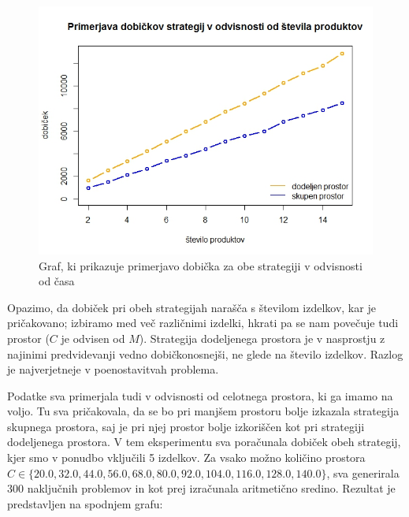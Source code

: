 \documentclass[a4paper]{article}
\begin{document}
\begin{figure}[ht]

\includegraphics [scale = 0.68]{primerjava-strategij-stevilo-produktov}
\caption{Graf, ki prikazuje primerjavo dobička za obe strategiji v odvisnosti od časa}

\end{figure}


Opazimo, da dobiček pri obeh strategijah narašča s številom izdelkov, kar je pričakovano; izbiramo med več različnimi izdelki, hkrati pa se nam povečuje tudi prostor ($C$ je odvisen od $M$). Strategija dodeljenega prostora je v nasprostju z najinimi predvidevanji vedno dobičkonosnejši, ne glede na število izdelkov. Razlog je najverjetneje v poenostavitvah problema. 

Podatke sva primerjala tudi v odvisnosti od celotnega prostora, ki ga imamo na voljo. Tu sva pričakovala, da se bo pri manjšem prostoru bolje izkazala strategija skupnega prostora, saj je pri njej prostor bolje izkoriščen kot pri strategiji dodeljenega prostora. V tem eksperimentu sva poračunala dobiček obeh strategij, kjer smo v ponudbo vključili 5 izdelkov. Za vsako možno količino prostora $C \in \{20.0, 32.0, 44.0, 56.0, 68.0, 80.0, 92.0, 104.0, 116.0, 128.0, 140.0\}$, sva generirala 300 naključnih problemov in kot prej izračunala aritmetično sredino. Rezultat je predstavljen na spodnjem grafu:
\end{document}
